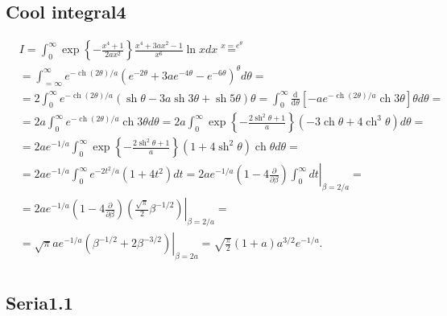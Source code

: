 	\subsection{Cool integral4}
	
	$$
	\begin{aligned}
		& I=\int_0^{\infty} \exp \left\{-\frac{x^4+1}{2 a x^2}\right\} \frac{x^4+3 a x^2-1}{x^6} \ln x d x \stackrel{x=e^\theta}{=} \\
		& =\int_{=\infty}^{\infty} e^{-\operatorname{ch}(2 \theta) / a}\left(e^{-2 \theta}+3 a e^{-4 \theta}-e^{-6 \theta}\right)^\theta d \theta= \\
		& =2 \int_0^{\infty} e^{-\operatorname{ch}(2 \theta) / a}(\operatorname{sh} \theta-3 a \operatorname{sh} 3 \theta+\operatorname{sh} 5 \theta) \theta=\int_0^{\infty} \frac{\mathrm{d}}{\mathrm{d} \theta}\left[-a e^{-\operatorname{ch}(2 \theta) / a} \operatorname{ch} 3 \theta\right] \theta d \theta= \\
		& =2 a \int_0^{\infty} e^{-\operatorname{ch}(2 \theta) / a} \operatorname{ch} 3 \theta d \theta=2 a \int_0^{\infty} \exp \left\{-\frac{2 \operatorname{sh}^2 \theta+1}{a}\right\}\left(-3 \operatorname{ch} \theta+4 \operatorname{ch}^3 \theta\right) d \theta= \\
		& =2 a e^{-1 / a} \int_0^{\infty} \exp \left\{-\frac{2 \operatorname{sh}^2 \theta+1}{a}\right\}\left(1+4 \operatorname{sh}^2 \theta\right) \operatorname{ch} \theta d \theta= \\
		& =2 a e^{-1 / a} \int_0^{\infty} e^{-2 t^2 / a}\left(1+4 t^2\right) d t=\left.2 a e^{-1 / a}\left(1-4 \frac{\partial}{\partial \beta}\right) \int_0^{\infty} d t\right|_{\beta=2 / a}= \\
		& =\left.2 a e^{-1 / a}\left(1-4 \frac{\partial}{\partial \beta}\right)\left(\frac{\sqrt{\pi}}{2} \beta^{-1 / 2}\right)\right|_{\beta=2 / a}= \\
		& =\left.\sqrt{\pi} a e^{-1 / a}\left(\beta^{-1 / 2}+2 \beta^{-3 / 2}\right)\right|_{\beta=2 a}=\sqrt{\frac{\pi}{2}}(1+a) a^{3/2} e^{-1 / a} . \\
		&
	\end{aligned}
	$$
	
	\subsection{Seria1.1}
	
